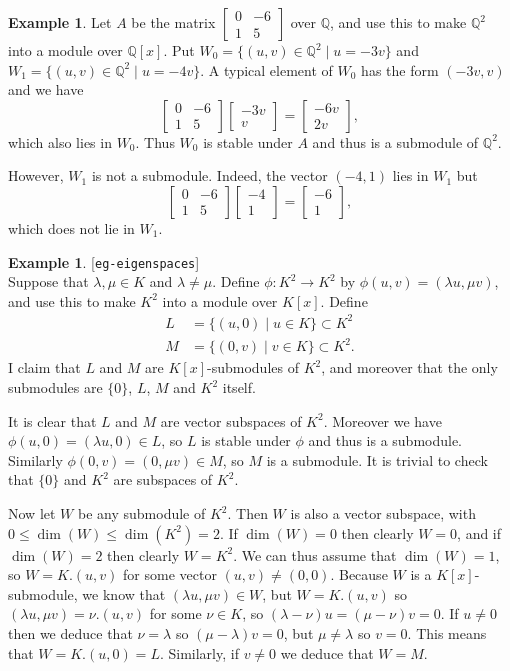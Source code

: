\documentclass{amsart}
\newcommand{\lbl}[1]{\label{#1}\textup{[\texttt{#1}]}\ \\}
\newcommand{\lbl}{\label}
\newcommand{\bbm}       {\left[\begin{matrix}}
\newcommand{\ebm}       {\end{matrix}\right]}
\newcommand{\Q}         {{\mathbb{Q}}}
\newcommand{\lm}        {\lambda}
\newcommand{\xra}       {\xrightarrow}
\newcommand{\st}        {\;|\;}
\renewcommand{\:}{\colon}
\theoremstyle{definition}
\newtheorem{example}[theorem]{Example}
\begin{document}
\begin{example}
 Let $A$ be the matrix $\bbm 0&-6\\1&5\ebm$ over $\Q$, and use this to
 make $\Q^2$ into a module over $\Q[x]$.  Put
 $W_0=\{(u,v)\in\Q^2\st u=-3v\}$ and $W_1=\{(u,v)\in\Q^2\st u=-4v\}$.
 A typical element of $W_0$ has the form $(-3v,v)$ and we have
 \[ \bbm 0&-6\\1&5 \ebm\bbm -3v\\v\ebm = \bbm -6v\\2v\ebm, \]
 which also lies in $W_0$.  Thus $W_0$ is stable under $A$ and thus is
 a submodule of $\Q^2$.

 However, $W_1$ is not a submodule.  Indeed, the vector $(-4,1)$ lies
 in $W_1$ but 
 \[ \bbm 0&-6\\1&5 \ebm\bbm -4\\1\ebm = \bbm -6\\1\ebm, \]
 which does not lie in $W_1$.
\end{example}
\begin{example}\lbl{eg-eigenspaces}
 Suppose that $\lm,\mu\in K$ and $\lm\neq\mu$.  Define
 $\phi\:K^2\xra{}K^2$ by $\phi(u,v)=(\lm u,\mu v)$, and use this to
 make $K^2$ into a module over $K[x]$.  Define
 \begin{align*}
  L &= \{ (u,0) \st u\in K \} \subset K^2 \\
  M &= \{ (0,v) \st v\in K \} \subset K^2.
 \end{align*}
 I claim that $L$ and $M$ are $K[x]$-submodules of $K^2$, and moreover
 that the only submodules are $\{0\}$, $L$, $M$ and $K^2$ itself.

 It is clear that $L$ and $M$ are vector subspaces of $K^2$.  Moreover
 we have $\phi(u,0)=(\lm u,0)\in L$, so $L$ is stable under $\phi$ and
 thus is a submodule.  Similarly $\phi(0,v)=(0,\mu v)\in M$, so $M$ is
 a submodule.  It is trivial to check that $\{0\}$ and $K^2$ are
 subspaces of $K^2$.

 Now let $W$ be any submodule of $K^2$.  Then $W$ is also a vector
 subspace, with $0\leq\dim(W)\leq\dim(K^2)=2$.  If $\dim(W)=0$ then
 clearly $W=0$, and if $\dim(W)=2$ then clearly $W=K^2$.  We can thus
 assume that $\dim(W)=1$, so $W=K.(u,v)$ for some vector
 $(u,v)\neq(0,0)$.  Because $W$ is a $K[x]$-submodule, we know that
 $(\lm u,\mu v)\in W$, but $W=K.(u,v)$ so $(\lm u,\mu v)=\nu.(u,v)$
 for some $\nu\in K$, so $(\lm-\nu)u=(\mu-\nu)v=0$.  If $u\neq 0$ then
 we deduce that $\nu=\lm$ so $(\mu-\lm)v=0$, but $\mu\neq\lm$ so
 $v=0$.  This means that $W=K.(u,0)= L$.  Similarly, if $v\neq 0$ we
 deduce that $W=M$.
\end{example}
\end{document}
